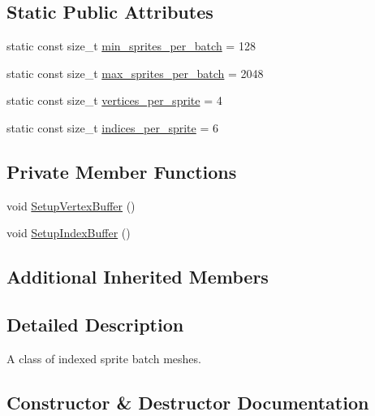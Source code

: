 \subsection*{Static Public Attributes}
\begin{DoxyCompactItemize}
\item 
static const size\+\_\+t \hyperlink{classmage_1_1_sprite_batch_mesh_abf82001c09270c14695bec433cf9810d}{min\+\_\+sprites\+\_\+per\+\_\+batch} = 128
\item 
static const size\+\_\+t \hyperlink{classmage_1_1_sprite_batch_mesh_a562657a44b2b155e8d5496bfe8101ba2}{max\+\_\+sprites\+\_\+per\+\_\+batch} = 2048
\item 
static const size\+\_\+t \hyperlink{classmage_1_1_sprite_batch_mesh_a450088fe9797bc26008ede487b39f0d7}{vertices\+\_\+per\+\_\+sprite} = 4
\item 
static const size\+\_\+t \hyperlink{classmage_1_1_sprite_batch_mesh_aeac9ce4a3a16f212a5bb29f89038110b}{indices\+\_\+per\+\_\+sprite} = 6
\end{DoxyCompactItemize}
\subsection*{Private Member Functions}
\begin{DoxyCompactItemize}
\item 
void \hyperlink{classmage_1_1_sprite_batch_mesh_ad3b68ac00e3dfb09ed495ce66f1d6fda}{Setup\+Vertex\+Buffer} ()
\item 
void \hyperlink{classmage_1_1_sprite_batch_mesh_a628ab5a3dd2df0c624b7dc99bcff7f98}{Setup\+Index\+Buffer} ()
\end{DoxyCompactItemize}
\subsection*{Additional Inherited Members}


\subsection{Detailed Description}
A class of indexed sprite batch meshes. 

\subsection{Constructor \& Destructor Documentation}
\hypertarget{classmage_1_1_sprite_batch_mesh_a7664804b05d08b7126c3efedee5c2588}{}\label{classmage_1_1_sprite_batch_mesh_a7664804b05d08b7126c3efedee5c2588} 
